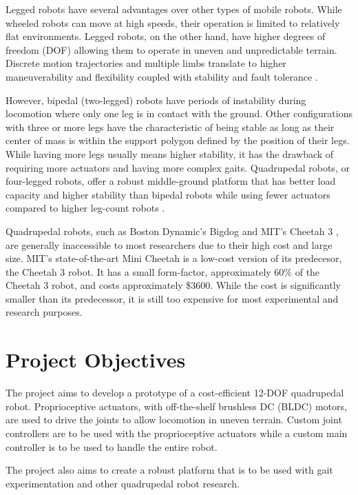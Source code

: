\documentclass[english]{upeeei}
\begin{document}
Legged robots have several advantages over other types of mobile robots. While wheeled robots can move at high speeds, their operation is limited to relatively flat environments. Legged robots, on the other hand, have higher degrees of freedom (DOF) allowing them to operate in uneven and unpredictable terrain. Discrete motion trajectories and multiple limbs translate to higher maneuverability and flexibility coupled with stability and fault tolerance \cite{quadrobotlegs}.

However, bipedal (two-legged) robots have periods of instability during locomotion where only one leg is in contact with the ground. Other configurations with three or more legs have the characteristic of being stable as long as their center of mass is within the support polygon defined by the position of their legs. While having more legs usually means higher stability, it has the drawback of requiring more actuators and having more complex gaits. Quadrupedal robots, or four-legged robots, offer a robust middle-ground platform that has better load capacity and higher stability than bipedal robots while using fewer actuators compared to higher leg-count robots \cite{quadrobotlegs}.

Quadrupedal robots, such as Boston Dynamic's Bigdog \cite{bigdog} and MIT's Cheetah 3 \cite{cheetah3}, are generally inaccessible to most researchers due to their high cost and large size. MIT's state-of-the-art Mini Cheetah \cite{minicheetah} is a low-cost version of its predecesor, the Cheetah 3 robot. It has a small form-factor, approximately 60\% of the Cheetah 3 robot, and costs approximately \$3600. While the cost is significantly smaller than its predecessor, it is still too expensive for most experimental and research purposes.

\section{Project Objectives}

The project aims to develop a prototype of a cost-efficient 12-DOF quadrupedal robot. Proprioceptive actuators, with off-the-shelf brushless DC (BLDC) motors, are used to drive the joints to allow locomotion in uneven terrain. Custom joint controllers are to be used with the proprioceptive actuators while a custom main controller is to be used to handle the entire robot.

The project also aims to create a robust platform that is to be used with gait experimentation and other quadrupedal robot research.
\end{document}
